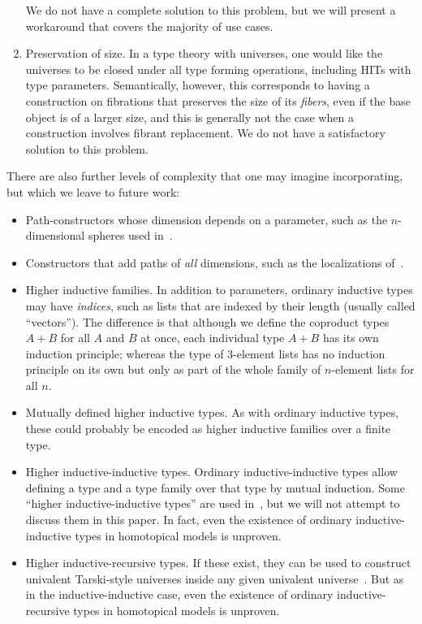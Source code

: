 \documentclass{amsart}
\begin{document}
\begin{enumerate}
  We do not have a complete solution to this problem, but we will present a workaround that covers the majority of use cases.\label{item:issue:pathops}
\item Preservation of size.
  In a type theory with universes, one would like the universes to be closed under all type forming operations, including HITs with type parameters.
  Semantically, however, this corresponds to having a construction on fibrations that preserves the size of its \emph{fibers}, even if the base object is of a larger size, and this is generally not the case when a construction involves fibrant replacement.
  We do not have a satisfactory solution to this problem.\label{item:issue:size}
\end{enumerate}

There are also further levels of complexity that one may imagine incorporating, but which we leave to future work:

\begin{itemize}
\item Path-constructors whose dimension depends on a parameter, such as the $n$-dimensional spheres used in~\cite{lb:pinsn}.
\item Constructors that add paths of \emph{all} dimensions, such as the localizations of~\cite{shulman:univprop-nofunext}.
\item Higher inductive families.
  In addition to parameters, ordinary inductive types may have \emph{indices}, such as lists that are indexed by their length (usually called ``vectors'').
  The difference is that although we define the coproduct types $A+B$ for all $A$ and $B$ at once, each individual type $A+B$ has its own induction principle; whereas the type of 3-element lists has no induction principle on its own but only as part of the whole family of $n$-element lists for all $n$.
\item Mutually defined higher inductive types.
  As with ordinary inductive types, these could probably be encoded as higher inductive families over a finite type.
\item Higher inductive-inductive types.
  Ordinary inductive-inductive types allow defining a type and a type family over that type by mutual induction.
  Some ``higher inductive-inductive types'' are used in~\cite[Chapter 11]{hottbook}, but we will not attempt to discuss them in this paper.
  In fact, even the existence of ordinary inductive-inductive types in homotopical models is unproven.
\item Higher inductive-recursive types.
  If these exist, they can be used to construct univalent Tarski-style universes inside any given univalent universe~\cite{shulman:hiru-tdd}.
  But as in the inductive-inductive case, even the existence of ordinary inductive-recursive types in homotopical models is unproven.
\end{itemize}
\end{document}
